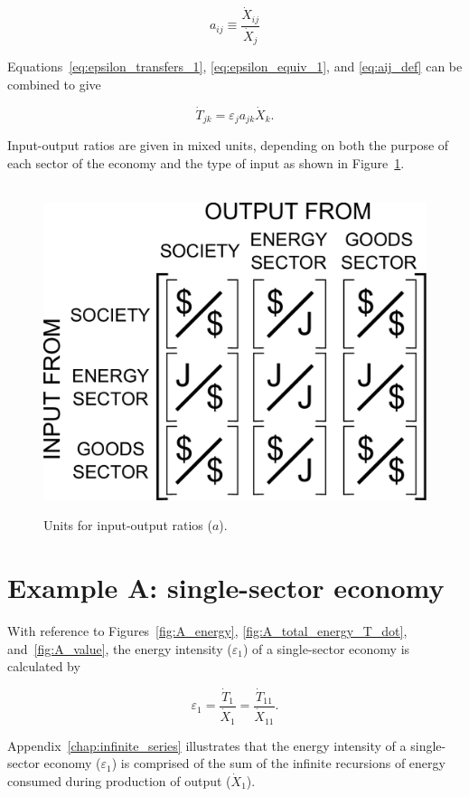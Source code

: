 \begin{equation} \label{eq:aij_def}
	a_{ij} \equiv \frac{\dot{X}_{ij}}{\dot{X}_{j}}
\end{equation}

\noindent{}Equations~\ref{eq:epsilon_transfers_1}, 
\ref{eq:epsilon_equiv_1}, and 
\ref{eq:aij_def} can be combined to give

\begin{equation}
	\dot{T}_{jk} = \varepsilon_{j} a_{jk} \dot{X}_{k}.
\end{equation}

Input-output ratios are given in mixed units, 
depending on both the purpose of each sector of the economy 
and the type of input as shown in Figure~\ref{fig:A_matrix_units}.

\begin{figure}[h!]
\centering\
\includegraphics[width=0.4\linewidth]{Part_2/Chapter_Intensity/images/I-O_units.pdf}
\caption[Units for input-output ratios]{ Units for input-output ratios ($a$).}
\label{fig:A_matrix_units}
\end{figure}


\section{Example A: single-sector economy} %

With reference to Figures~\ref{fig:A_energy}, 
\ref{fig:A_total_energy_T_dot}, 
and~\ref{fig:A_value},
the energy intensity ($\varepsilon_{1}$) of a single-sector economy is calculated by

\begin{equation} \label{eq:A-energy_intensity}
	\varepsilon_{1} 
	= \frac{\dot{T}_{1}}{\dot{X}_{1}} 
	= \frac{\dot{T}_{11}}{\dot{X}_{11}}.
\end{equation}

Appendix~\ref{chap:infinite_series} illustrates that the energy 
intensity of a single-sector economy ($\varepsilon_{1}$) 
is comprised of the sum of the infinite recursions
of energy consumed during production of output ($\dot{X}_{1}$).

